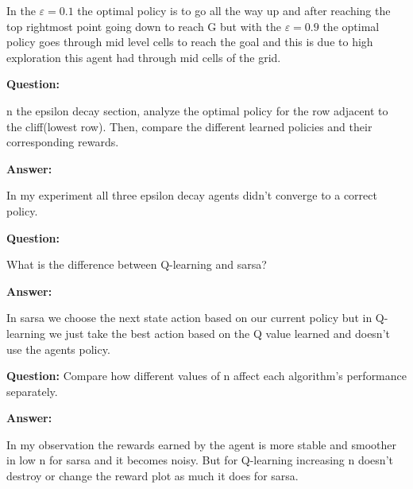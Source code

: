 \documentclass[12pt]{article}
\begin{document}
{{{{In the $\varepsilon=0.1$ the optimal policy is to go all the way up and after reaching the top rightmost point going down to reach G but with the $\varepsilon=0.9$ the optimal policy goes through mid level cells to reach the goal and this is due to high exploration this agent had through mid cells of the grid.

\textbf{Question:}

n the epsilon decay section, analyze the optimal policy for the row adjacent to the cliff(lowest row).
Then, compare the different learned policies and their corresponding rewards.

\textbf{Answer:}

In my experiment all three epsilon decay agents didn't converge to a correct policy.

\textbf{Question:}

What is the difference between Q-learning and sarsa?

\textbf{Answer:}

In sarsa we choose the next state action based on our current policy but in Q-learning we just take the best action based on the Q value learned and doesn't use the agents policy.

\textbf{Question:}
Compare how different values of n affect each algorithm’s performance separately.

\textbf{Answer:}

In my observation the rewards earned by the agent is more stable and smoother in low n for sarsa and it becomes noisy. But for Q-learning increasing n doesn't destroy or change the reward plot as much it does for sarsa.

}}


\newpage

{}}}
\end{document}
